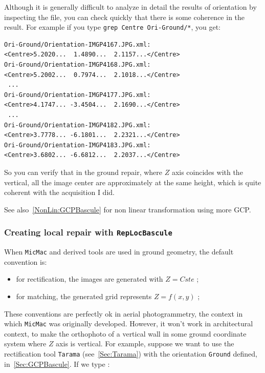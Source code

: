 Although it is generally difficult to analyze in detail the results of orientation
by inspecting the file, you can check quickly that there is some coherence in the result.
For example if you type {\tt grep Centre Ori-Ground/*}, you get:


{\scriptsize
\begin{verbatim}
Ori-Ground/Orientation-IMGP4167.JPG.xml:               <Centre>5.2020...  1.4890...  2.1157...</Centre>
Ori-Ground/Orientation-IMGP4168.JPG.xml:               <Centre>5.2002...  0.7974...  2.1018...</Centre>
 ...
Ori-Ground/Orientation-IMGP4177.JPG.xml:               <Centre>4.1747... -3.4504...  2.1690...</Centre>
 ...
Ori-Ground/Orientation-IMGP4182.JPG.xml:               <Centre>3.7778... -6.1801...  2.2321...</Centre>
Ori-Ground/Orientation-IMGP4183.JPG.xml:               <Centre>3.6802... -6.6812...  2.2037...</Centre>
\end{verbatim}
}

So you can verify that in the ground repair, where $Z$ axis coincides with the vertical,
all the image center are approximately at the same height, which is quite coherent with
the acquisition I did.

See also~\ref{NonLin:GCPBascule} for non linear transformation using more GCP.

\subsubsection{Creating local repair with {\tt RepLocBascule}}

\label{Sec:RepLocBascule}

When {\tt MicMac} and derived tools are used in ground geometry, the
default convention is:

\begin{itemize}
   \item  for rectification, the images are  generated with $Z=Cste$ ;
   \item  for matching, the generated grid represents $Z=f(x,y)$ ;
\end{itemize}


These conventions are perfectly ok in aerial photogrammetry,
the context  in which {\tt MicMac} was originally developed. However,
it won't work in architectural context, to make the orthophoto of a
vertical wall in some ground coordinate system where $Z$ axis  is vertical.
For example, suppose we want to use the rectification tool {\tt Tarama} (see~\ref{Sec:Tarama})
with the orientation {\tt Ground} defined, in~\ref{Sec:GCPBascule}.
If we type :

